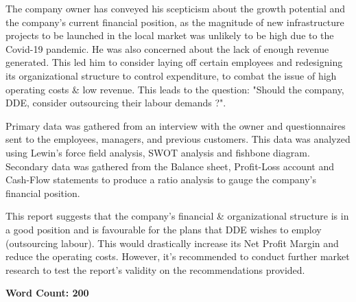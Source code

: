 
{The company owner has conveyed his scepticism about the growth potential and the company's current financial position, as the magnitude of new infrastructure projects to be launched in the local market was unlikely to be high due to the Covid-19 pandemic. He was also concerned about the lack of enough revenue generated. This led him to consider laying off certain employees and redesigning its organizational structure to control expenditure, to combat the issue of high operating costs & low revenue. This leads to the question: "Should the company, DDE, consider outsourcing their labour demands ?".}

\vspace{0.25cm}

{Primary data was gathered from an interview with the owner and questionnaires sent to the employees, managers, and previous customers. This data was analyzed using Lewin's force field analysis, SWOT analysis and fishbone diagram. Secondary data was gathered from the Balance sheet, Profit-Loss account and Cash-Flow statements to produce a ratio analysis to gauge the company's financial position.}

\vspace{0.25cm}

{This report suggests that the company's financial \& organizational structure is in a good position and is favourable for the plans that DDE wishes to employ (outsourcing labour). This would drastically increase its Net Profit Margin and reduce the operating costs. However, it's recommended to conduct further market research to test the report's validity on the recommendations provided.}

\vspace{0.5cm}

\raggedright

{\textbf{Word Count: 200}}

